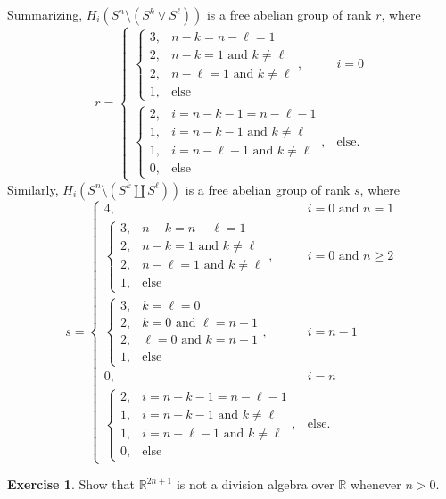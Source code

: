 \documentclass[10pt]{article}
\newcommand{\RR}{\mathbb{R}}
\theoremstyle{definition}
\newtheorem{exer}{Exercise}
\begin{document}
Summarizing, $H_i(S^n \setminus (S^k \vee S^\ell))$ is a free abelian group of rank $r$, where
$$r = \begin{cases}
\begin{cases}
3, &n - k = n - \ell = 1\\
2, &n - k = 1 \text{ and } k \neq \ell\\
2, &n - \ell = 1 \text{ and } k \neq \ell\\
1, &\text{else}
\end{cases}, &i = 0\\
\begin{cases}
2, &i = n - k - 1 = n - \ell - 1\\
1, &i = n - k - 1 \text { and } k \neq \ell\\
1, &i = n - \ell - 1 \text { and } k \neq \ell\\
0, &\text{else}
\end{cases}, &\text{else}.
\end{cases}$$
Similarly, $H_i(S^n \setminus (S^k \amalg S^\ell))$ is a free abelian group of rank $s$, where
$$s = \begin{cases}
4, &i = 0 \text{ and } n = 1\\
\begin{cases}
3, &n - k = n - \ell = 1\\
2, &n - k = 1 \text{ and } k \neq \ell\\
2, &n - \ell = 1 \text{ and } k \neq \ell\\
1, &\text{else}
\end{cases}, &i = 0 \text{ and } n \geq 2\\
\begin{cases}
3, &k = \ell = 0\\
2, &k = 0 \text{ and } \ell = n - 1\\
2, &\ell = 0 \text{ and } k = n - 1\\
1, &\text{else}
\end{cases}, &i = n - 1\\
0, &i = n\\
\begin{cases}
2, &i = n - k - 1 = n - \ell - 1\\
1, &i = n - k - 1 \text { and } k \neq \ell\\
1, &i = n - \ell - 1 \text { and } k \neq \ell\\
0, &\text{else}
\end{cases}, &\text{else}.
\end{cases}$$

\begin{exer}
Show that $\RR^{2n+1}$ is not a division algebra over $\RR$ whenever $n > 0$.
\end{exer}
\end{document}

